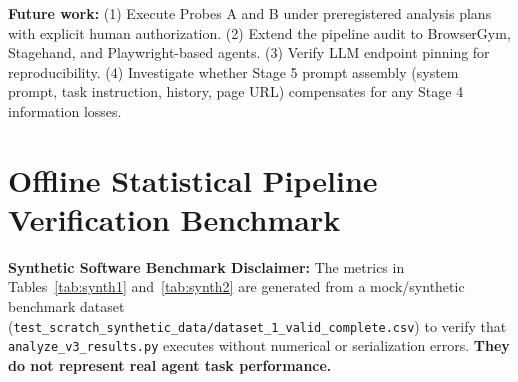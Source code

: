 \documentclass[conference]{IEEEtran}
\begin{document}
\textbf{Future work:} (1) Execute Probes A and B under preregistered analysis plans with explicit human authorization. (2) Extend the pipeline audit to BrowserGym, Stagehand, and Playwright-based agents. (3) Verify LLM endpoint pinning for reproducibility. (4) Investigate whether Stage 5 prompt assembly (system prompt, task instruction, history, page URL) compensates for any Stage 4 information losses.




\clearpage
\appendix

\section{Offline Statistical Pipeline Verification Benchmark}
\label{app:benchmark}

\textbf{Synthetic Software Benchmark Disclaimer:} The metrics in Tables~\ref{tab:synth1} and~\ref{tab:synth2} are generated from a mock/synthetic benchmark dataset (\texttt{test\_scratch\_synthetic\_data/dataset\_1\_valid\_complete.csv}) to verify that \texttt{analyze\_v3\_results.py} executes without numerical or serialization errors. \textbf{They do not represent real agent task performance.}
\end{document}

